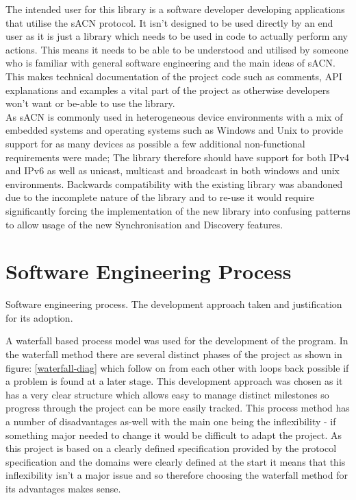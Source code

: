 \documentclass[11pt,a4paper]{article}
\begin{document}
The intended user for this library is a software developer developing applications that utilise the sACN protocol. It isn't designed to be used directly by an end user as it is just a library which needs to be used in code to actually perform any actions. This means it needs to be able to be understood and utilised by someone who is familiar with general software engineering and the main ideas of sACN. This makes technical documentation of the project code such as comments, API explanations and examples a vital part of the project as otherwise developers won't want or be-able to use the library.\\

As sACN is commonly used in heterogeneous device environments with a mix of embedded systems and operating systems such as Windows and Unix to provide support for as many devices as possible a few additional non-functional requirements were made; The library therefore should have support for both IPv4 and IPv6 as well as unicast, multicast and broadcast in both windows and unix environments. Backwards compatibility with the existing library was abandoned due to the incomplete nature of the library and to re-use it would require significantly forcing the implementation of the new library into confusing patterns to allow usage of the new Synchronisation and Discovery features. \\	

\section{Software Engineering Process}
Software engineering process. The development approach taken and justification for its adoption.

A waterfall based process model was used for the development of the program. In the waterfall method there are several distinct phases of the project as shown in figure: \ref{waterfall-diag} which follow on from each other with loops back possible if a problem is found at a later stage. This development approach was chosen as it has a very clear structure which allows easy to manage distinct milestones so progress through the project can be more easily tracked. This process method has a number of disadvantages as-well with the main one being the inflexibility - if something major needed to change it would be difficult to adapt the project.  As this project is based on a clearly defined specification provided by the protocol specification and the domains were  clearly defined at the start it means that this inflexibility isn't a major issue and so therefore choosing the waterfall method for its advantages makes sense. 
\end{document}

